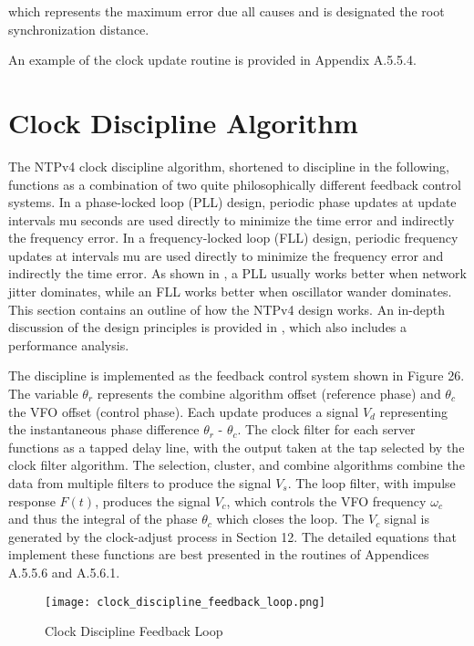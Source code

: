 which represents the maximum error due all causes and is designated
the root synchronization distance.

An example of the clock update routine is provided in
Appendix A.5.5.4.

\section{Clock Discipline Algorithm}

The NTPv4 clock discipline algorithm, shortened to discipline in the
following, functions as a combination of two quite philosophically
different feedback control systems.  In a phase-locked loop (PLL)
design, periodic phase updates at update intervals mu seconds are
used directly to minimize the time error and indirectly the frequency
error.  In a frequency-locked loop (FLL) design, periodic frequency
updates at intervals mu are used directly to minimize the frequency
error and indirectly the time error.  As shown in \cite{ref7}, a PLL
usually works better when network jitter dominates, while an FLL
works better when oscillator wander dominates.  This section contains
an outline of how the NTPv4 design works.  An in-depth discussion of
the design principles is provided in \cite{ref7}, which also includes a
performance analysis.

The discipline is implemented as the feedback control system shown in
Figure 26.  The variable $ \theta_r $ represents the combine algorithm
offset (reference phase) and $ \theta_c $ the VFO offset (control phase).
Each update produces a signal $ V_d $ representing the instantaneous
phase difference $ \theta_r $ - $ \theta_c $.  The clock filter for each server
functions as a tapped delay line, with the output taken at the tap
selected by the clock filter algorithm.  The selection, cluster, and
combine algorithms combine the data from multiple filters to produce
the signal $ V_s $.  The loop filter, with impulse response $ F(t) $,
produces the signal $ V_c $, which controls the VFO frequency $ \omega_c $ and
thus the integral of the phase $ \theta_c $ which closes the loop.  The
$ V_c $ signal is generated by the clock-adjust process in Section 12.
The detailed equations that implement these functions are best
presented in the routines of Appendices A.5.5.6 and A.5.6.1.

\begin{figure}
\centering
\texttt{[image: clock\_discipline\_feedback\_loop.png]}
\caption{Clock Discipline Feedback Loop}
\label{clock_discipline_feedback_loop}
\end{figure}

